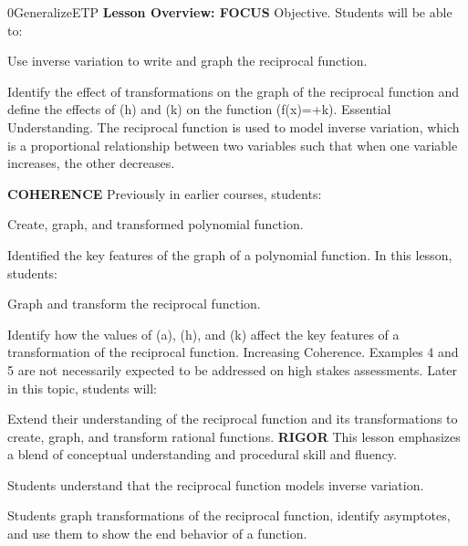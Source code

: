\documentclass{article}
\newenvironment{te-addendum}[2]{}{}     %
\newcommand{\te}[1]{}                   %
\begin{document}
\begin{te-addendum}{0}{GeneralizeETP}
\textbf{Lesson Overview: FOCUS}
Objective. Students will be able to:
\item Use inverse variation to write and graph the reciprocal function.
\item Identify the effect of transformations on the graph of the reciprocal function and define the effects of (h) and (k) on the function (f(x)=+k).
Essential Understanding. The reciprocal function is used to model inverse variation, which is a proportional relationship between two variables such that when one variable increases, the other decreases.
\te{The printed increasing/decreasing description assumes a positive constant of variation on one branch; it is not a general description for negative constants.}
\textbf{COHERENCE}
Previously in earlier courses, students:
\item Create, graph, and transformed polynomial function.
\item Identified the key features of the graph of a polynomial function.
In this lesson, students:
\item Graph and transform the reciprocal function.
\item Identify how the values of (a), (h), and (k) affect the key features of a transformation of the reciprocal function.
Increasing Coherence. Examples 4 and 5 are not necessarily expected to be addressed on high stakes assessments.
Later in this topic, students will:
\item Extend their understanding of the reciprocal function and its transformations to create, graph, and transform rational functions.
\textbf{RIGOR}
This lesson emphasizes a blend of conceptual understanding and procedural skill and fluency.
\item Students understand that the reciprocal function models inverse variation.
\item Students graph transformations of the reciprocal function, identify asymptotes, and use them to show the end behavior of a function.
\end{te-addendum}
\end{document}
